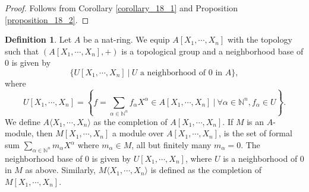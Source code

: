 \documentclass[10pt]{article}
\numberwithin{equation}{section}
\theoremstyle{definition}
\newtheorem{definition}{Definition}[subsection]
\newcommand{\N}[0]{\mathbb{N}}
\newcommand{\sep}[0]{\:|\:}
\begin{document}
\begin{proof}
    Follows from Corollary \ref{corollary_18_1} and Proposition \ref{proposition_18_2}.
\end{proof}

\begin{definition}
    \label{definition_19_1}
    Let $A$ be a nat-ring. We equip $A[X_1,\cdots,X_n]$ with the topology such that $(A[X_1,\cdots,X_n],+)$ is a topological group and a neighborhood base of $0$ is given by
    \begin{equation*}
        \{U[X_1,\cdots,X_n]\sep \text{$U$ a neighborhood of $0$ in $A$}\},
    \end{equation*}
    where
    \begin{equation*}
        U[X_1,\cdots,X_n] = \left\{f = \sum_{\alpha\in\N^n}f_\alpha X^\alpha\in A[X_1,\cdots,X_n]\sep \forall \alpha\in\N^n, f_\alpha\in U\right\}.
    \end{equation*}
    We define $A\langle X_1,\cdots,X_n\rangle $ as the completion of $A[X_1,\cdots,X_n]$. If $M$ is an $A$-module, then $M[X_1,\cdots,X_n]$ a module over $A[X_1,\cdots,X_n]$, is the set of formal sum $\sum_{\alpha\in\N^n}m_\alpha X^\alpha$ where $m_\alpha\in M$, all but finitely many $m_\alpha=0$.
    The neighborhood base of $0$ is given by $U[X_1,\cdots,X_n]$, where $U$ is a neighborhood of $0$ in $M$ as above. Similarly, $M\langle X_1,\cdots,X_n\rangle$ is defined as the completion of $M[X_1,\cdots,X_n]$.
\end{definition}
\end{document}
